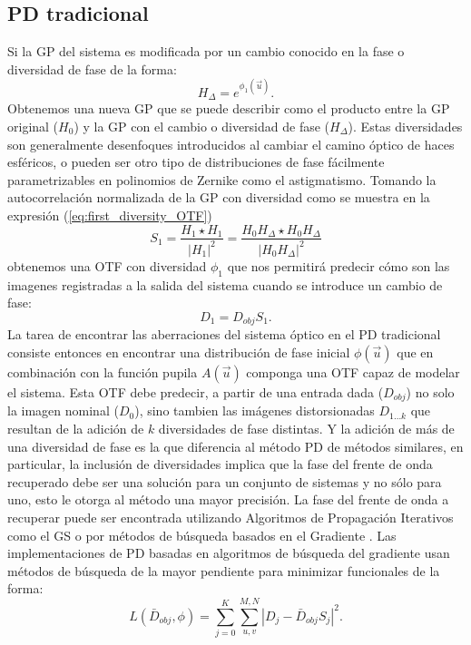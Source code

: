\subsection{PD tradicional}
\label{sec:ChPD_PD_tradicional}
Si la GP del sistema es modificada por un cambio conocido en la fase o
diversidad de fase de la forma:
$$H_{\Delta}=e^{\phi_1(\vec{u})}.$$ 
Obtenemos una nueva GP que se puede describir como el producto entre
la GP original ($H_{0}$) y la GP con el cambio o diversidad de fase
($H_{\Delta}$). Estas diversidades son generalmente desenfoques
introducidos al cambiar el camino óptico de haces esféricos, o pueden
ser otro tipo de distribuciones de fase fácilmente parametrizables en
polinomios de Zernike como el astigmatismo. Tomando la autocorrelación normalizada de la GP con
diversidad como se muestra en la expresión (\ref{eq:first_diversity_OTF})
\begin{equation}\label{eq:first_diversity_OTF}
S_1 = \frac{H_1\star H_1}{|H_1|^2} = \frac{H_0H_{\Delta} \star H_0H_{\Delta}}{|H_0H_{\Delta}|^2}
\end{equation}
obtenemos una OTF con diversidad $\phi_1$ que nos permitirá predecir cómo son
las imagenes registradas a la salida del sistema cuando se introduce
un cambio de fase: $$D_1 = D_{obj} S_1.$$ 
La tarea de encontrar las aberraciones del sistema óptico en el PD
tradicional consiste entonces en encontrar una distribución de fase
inicial $\phi(\vec{u})$ que en combinación con la función pupila
$A(\vec{u})$ componga una OTF capaz de modelar el
sistema. Esta OTF debe predecir, a partir de una entrada dada 
($D_{obj}$)  no solo la imagen nominal ($D_0$), sino tambien
las imágenes distorsionadas $D_{1...k}$ que resultan de la adición de
$k$ diversidades de fase distintas. Y la adición de más de una
diversidad de fase es la que diferencia al método PD de métodos
similares, en particular, la inclusión de diversidades implica que la
fase del frente de onda recuperado debe ser una solución para un
conjunto de sistemas y no sólo para uno, esto le otorga al método una
mayor precisión.  La fase del frente de onda a recuperar puede ser
encontrada utilizando Algoritmos de Propagación Iterativos como el GS o por
métodos de búsqueda basados en el Gradiente .
Las implementaciones de PD basadas en algoritmos de búsqueda del
gradiente usan métodos de búsqueda de la mayor pendiente para
minimizar funcionales de la forma:
\begin{equation}\label{eq:metric}
L(\bar{D}_{obj}, \phi)= \sum_{j=0}^{K} \sum_{u,v}^{M,N}  \left |D_{j} - \bar{D}_{obj} S_{j} \right | ^2.
\end{equation}

